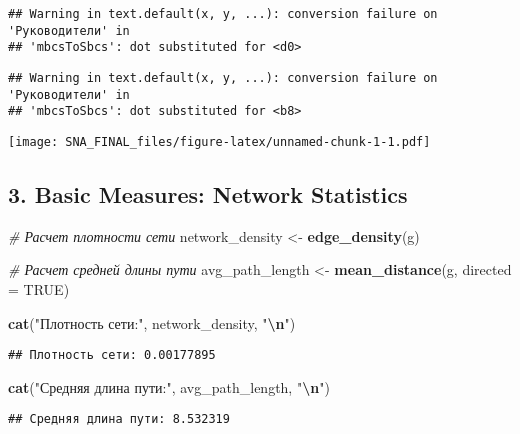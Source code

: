 \documentclass[
]{article}
\newenvironment{Shaded}{\begin{snugshade}}{\end{snugshade}}
\newcommand{\AttributeTok}[1]{\textcolor[rgb]{0.13,0.29,0.53}{#1}}
\newcommand{\CommentTok}[1]{\textcolor[rgb]{0.56,0.35,0.01}{\textit{#1}}}
\newcommand{\ConstantTok}[1]{\textcolor[rgb]{0.56,0.35,0.01}{#1}}
\newcommand{\FunctionTok}[1]{\textcolor[rgb]{0.13,0.29,0.53}{\textbf{#1}}}
\newcommand{\NormalTok}[1]{#1}
\newcommand{\OtherTok}[1]{\textcolor[rgb]{0.56,0.35,0.01}{#1}}
\newcommand{\SpecialCharTok}[1]{\textcolor[rgb]{0.81,0.36,0.00}{\textbf{#1}}}
\newcommand{\StringTok}[1]{\textcolor[rgb]{0.31,0.60,0.02}{#1}}
\begin{document}
\begin{verbatim}
## Warning in text.default(x, y, ...): conversion failure on 'Руководители' in
## 'mbcsToSbcs': dot substituted for <d0>
\end{verbatim}

\begin{verbatim}
## Warning in text.default(x, y, ...): conversion failure on 'Руководители' in
## 'mbcsToSbcs': dot substituted for <b8>
\end{verbatim}

\texttt{[image: SNA\_FINAL\_files/figure-latex/unnamed-chunk-1-1.pdf]}

\hypertarget{basic-measures-network-statistics}{%
\subsection{3. Basic Measures: Network
Statistics}\label{basic-measures-network-statistics}}

\begin{Shaded}
\begin{Highlighting}[]
\CommentTok{\# Расчет плотности сети}
\NormalTok{network\_density }\OtherTok{\textless{}{-}} \FunctionTok{edge\_density}\NormalTok{(g)}

\CommentTok{\# Расчет средней длины пути}
\NormalTok{avg\_path\_length }\OtherTok{\textless{}{-}} \FunctionTok{mean\_distance}\NormalTok{(g, }\AttributeTok{directed =} \ConstantTok{TRUE}\NormalTok{)}

\FunctionTok{cat}\NormalTok{(}\StringTok{"Плотность сети:"}\NormalTok{, network\_density, }\StringTok{"}\SpecialCharTok{\textbackslash{}n}\StringTok{"}\NormalTok{)}
\end{Highlighting}
\end{Shaded}

\begin{verbatim}
## Плотность сети: 0.00177895
\end{verbatim}

\begin{Shaded}
\begin{Highlighting}[]
\FunctionTok{cat}\NormalTok{(}\StringTok{"Средняя длина пути:"}\NormalTok{, avg\_path\_length, }\StringTok{"}\SpecialCharTok{\textbackslash{}n}\StringTok{"}\NormalTok{)}
\end{Highlighting}
\end{Shaded}

\begin{verbatim}
## Средняя длина пути: 8.532319
\end{verbatim}
\end{document}
